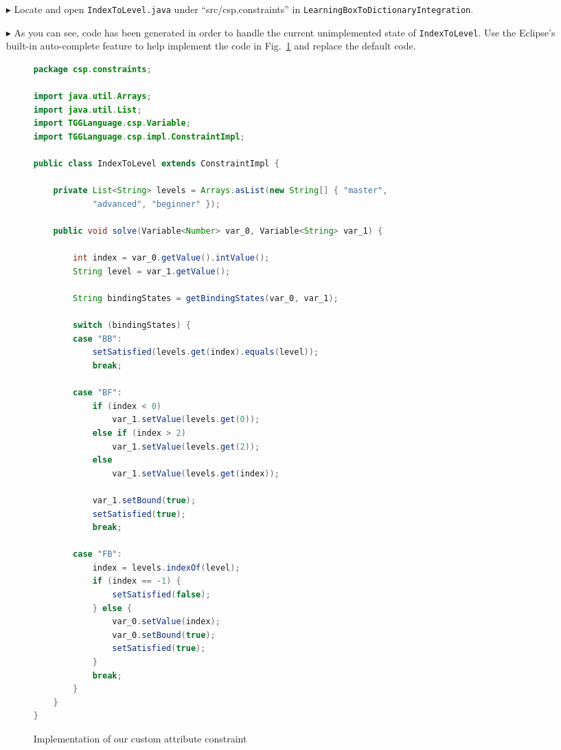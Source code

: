 \begin{itemize}
\item[$\blacktriangleright$] Locate and open \texttt{IndexToLevel.java} under ``src/csp.constraints'' in \texttt{LearningBoxToDictionaryIntegration}.

\item[$\blacktriangleright$] As you can see, code has been generated in order to handle the current unimplemented state of \texttt{IndexToLevel}. Use the
Eclipse's built-in auto-complete feature to help implement the code in Fig.~\ref{fig:indexToLevel} and replace the default code.

\begin{figure}[htbp]
\begin{center}
\begin{lstlisting}[language=Java,backgroundcolor=\color{white}, keywordstyle={\bfseries\color{purple}}]
package csp.constraints;

import java.util.Arrays;
import java.util.List;
import TGGLanguage.csp.Variable;
import TGGLanguage.csp.impl.ConstraintImpl;

public class IndexToLevel extends ConstraintImpl {

	private List<String> levels = Arrays.asList(new String[] { "master",
			"advanced", "beginner" });

	public void solve(Variable<Number> var_0, Variable<String> var_1) {

		int index = var_0.getValue().intValue();
		String level = var_1.getValue();

		String bindingStates = getBindingStates(var_0, var_1);

		switch (bindingStates) {
		case "BB":
			setSatisfied(levels.get(index).equals(level));
			break;

		case "BF":
			if (index < 0)
				var_1.setValue(levels.get(0));
			else if (index > 2)
				var_1.setValue(levels.get(2));
			else
				var_1.setValue(levels.get(index));

			var_1.setBound(true);
			setSatisfied(true);
			break;

		case "FB":
			index = levels.indexOf(level);
			if (index == -1) {
				setSatisfied(false);
			} else {
				var_0.setValue(index);
				var_0.setBound(true);
				setSatisfied(true);
			}
			break;
		}
	}
}
\end{lstlisting}
  \caption{Implementation of our custom attribute constraint}
  \label{fig:indexToLevel}
\end{center}
\end{figure}


\end{itemize}
